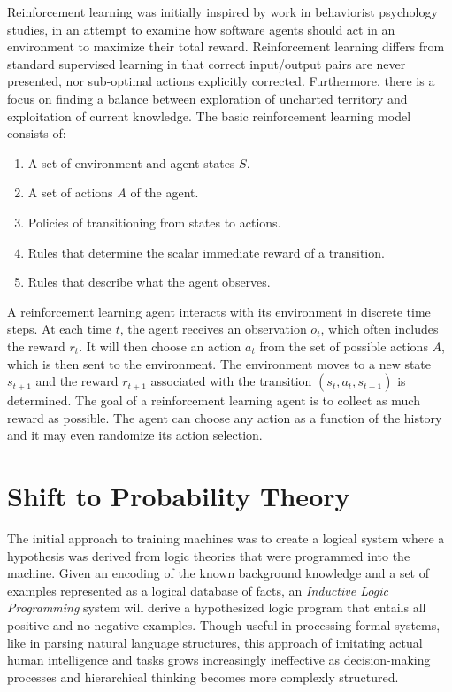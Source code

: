 \documentclass[12pt]{article}
\begin{document}
\begin{enumerate}
Reinforcement learning was initially inspired by work in behaviorist psychology studies, in an attempt to examine how software agents should act in an environment to maximize their total reward. Reinforcement learning differs from standard supervised learning in that correct input/output pairs are never presented, nor sub-optimal actions explicitly corrected. Furthermore, there is a focus on finding a balance between exploration of uncharted territory and exploitation of current knowledge. The basic reinforcement learning model consists of:
\begin{enumerate}
\renewcommand{\labelenumii}{\roman{enumii}.}
    \item A set of environment and agent states $S$.

    \item A set of actions $A$ of the agent.

    \item Policies of transitioning from states to actions.

    \item Rules that determine the scalar immediate reward of a transition.

    \item Rules that describe what the agent observes.
\end{enumerate}

A reinforcement learning agent interacts with its environment in discrete time steps. At each time $t$, the agent receives an observation $o_{t}$, which often includes the reward $r_{t}$. It will then choose an action $a_{t}$ from the set of possible actions $A$, which is then sent to the environment. The environment moves to a new state $s_{t+1}$ and the reward $r_{t+1}$ associated with the transition $ (s_{t},a_{t},s_{t+1})$ is determined. The goal of a reinforcement learning agent is to collect as much reward as possible. The agent can choose any action as a function of the history and it may even randomize its action selection.
\end{enumerate}

\newpage

\section*{Shift to Probability Theory}
The initial approach to training machines was to create a logical system where a hypothesis was derived from logic theories that were programmed into the machine. Given an encoding of the known background knowledge and a set of examples represented as a logical database of facts, an \textit{Inductive Logic Programming} system will derive a hypothesized logic program that entails all positive and no negative examples. Though useful in processing formal systems, like in parsing natural language structures, this approach of imitating actual human intelligence and tasks grows increasingly ineffective as decision-making processes and hierarchical thinking becomes more complexly structured.
\\
\end{document}
